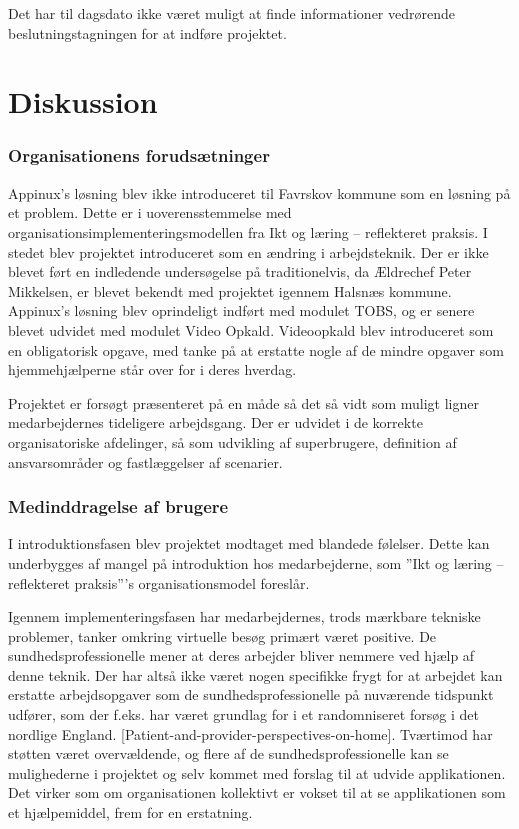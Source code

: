 Det har til dagsdato ikke været muligt at finde informationer vedrørende beslutningstagningen for at indføre projektet.

  
\section{Diskussion}
\subsubsection{Organisationens forudsætninger}
Appinux’s løsning blev ikke introduceret til Favrskov kommune som en løsning på et problem. Dette er i uoverensstemmelse med organisationsimplementeringsmodellen fra Ikt og læring – reflekteret praksis. I stedet blev projektet introduceret som en ændring i arbejdsteknik. Der er ikke blevet ført en indledende undersøgelse på traditionelvis, da Ældrechef Peter Mikkelsen, er blevet bekendt med projektet igennem Halsnæs kommune. Appinux’s løsning blev oprindeligt indført med modulet TOBS, og er senere blevet udvidet med modulet Video Opkald. Videoopkald blev introduceret som en obligatorisk opgave, med tanke på at erstatte nogle af de mindre opgaver som hjemmehjælperne står over for i deres hverdag. 

Projektet er forsøgt præsenteret på en måde så det så vidt som muligt ligner medarbejdernes tideligere arbejdsgang. Der er udvidet i de korrekte organisatoriske afdelinger, så som udvikling af superbrugere, definition af ansvarsområder og fastlæggelser af scenarier. 

\subsubsection{Medinddragelse af brugere}
I introduktionsfasen blev projektet modtaget med blandede følelser. Dette kan underbygges af mangel på introduktion hos medarbejderne, som ”Ikt og læring – reflekteret praksis”’s organisationsmodel foreslår. 

Igennem implementeringsfasen har medarbejdernes, trods mærkbare tekniske problemer, tanker omkring virtuelle besøg primært været positive. De sundhedsprofessionelle mener at deres arbejder bliver nemmere ved hjælp af denne teknik. Der har altså ikke været nogen specifikke frygt for at arbejdet kan erstatte arbejdsopgaver som de sundhedsprofessionelle på nuværende tidspunkt udfører, som der f.eks. har været grundlag for i et randomniseret forsøg i det nordlige England. [Patient-and-provider-perspectives-on-home]. Tværtimod har støtten været overvældende, og flere af de sundhedsprofessionelle kan se mulighederne i projektet og selv kommet med forslag til at udvide applikationen. Det virker som om organisationen kollektivt er vokset til at se applikationen som et hjælpemiddel, frem for en erstatning.

